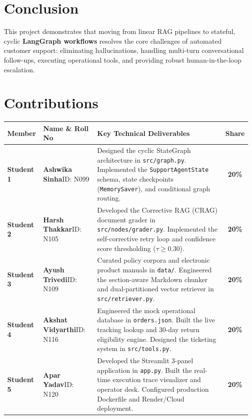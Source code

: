 \documentclass[11pt,a4paper]{article}
\begin{document}
\section{Conclusion}
This project demonstrates that moving from linear RAG pipelines to stateful, cyclic \textbf{LangGraph workflows} resolves the core challenges of automated customer support: eliminating hallucinations, handling multi-turn conversational follow-ups, executing operational tools, and providing robust human-in-the-loop escalation.

\section{Contributions}

\begin{table}[H]
\centering
\small
\begin{tabularx}{\textwidth}{|l|p{3.2cm}|p{8.5cm}|c|}
\hline
\textbf{Member} & \textbf{Name \& Roll No} & \textbf{Key Technical Deliverables} & \textbf{Share} \\
\hline
\textbf{Student 1} & \textbf{Ashwika Sinha}\newline ID: N099 & Designed the cyclic StateGraph architecture in \texttt{src/graph.py}. Implemented the \texttt{SupportAgentState} schema, state checkpoints (\texttt{MemorySaver}), and conditional graph routing. & \textbf{20\%} \\
\hline
\textbf{Student 2} & \textbf{Harsh Thakkar}\newline ID: N105 & Developed the Corrective RAG (CRAG) document grader in \texttt{src/nodes/grader.py}. Implemented the self-corrective retry loop and confidence score thresholding ($\tau \ge 0.30$). & \textbf{20\%} \\
\hline
\textbf{Student 3} & \textbf{Ayush Trivedi}\newline ID: N109 & Curated policy corpora and electronic product manuals in \texttt{data/}. Engineered the section-aware Markdown chunker and dual-partitioned vector retriever in \texttt{src/retriever.py}. & \textbf{20\%} \\
\hline
\textbf{Student 4} & \textbf{Akshat Vidyarthi}\newline ID: N116 & Engineered the mock operational database in \texttt{orders.json}. Built the live tracking lookup and 30-day return eligibility engine. Designed the ticketing system in \texttt{src/tools.py}. & \textbf{20\%} \\
\hline
\textbf{Student 5} & \textbf{Apar Yadav}\newline ID: N120 & Developed the Streamlit 3-panel application in \texttt{app.py}. Built the real-time execution trace visualizer and operator desk. Configured production Dockerfile and Render/Cloud deployment. & \textbf{20\%} \\
\hline
\end{tabularx}
\end{table}
\end{document}
